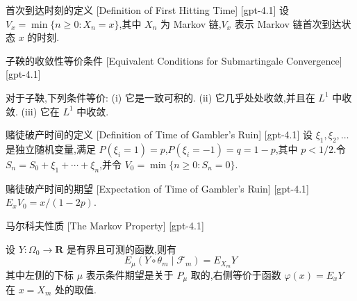 \documentclass[UTF8]{ctexart}
\begin{document}
    
    
    \begin{dfn}
        {首次到达时刻的定义}
        [Definition of First Hitting Time]
        [gpt-4.1]
        设 $V_{x} = \operatorname*{min} \{n \geq 0 : X_{n} = x\}$,其中 $X_n$ 为 Markov 链,$V_x$ 表示 Markov 链首次到达状态 $x$ 的时刻.
    \end{dfn}
    
    
    
    \begin{thm}
        {子鞅的收敛性等价条件}
        [Equivalent Conditions for Submartingale Convergence]
        [gpt-4.1]
        
对于子鞅,下列条件等价:
(i) 它是一致可积的.
(ii) 它几乎处处收敛,并且在 $L^1$ 中收敛.
(iii) 它在 $L^1$ 中收敛.

    \end{thm}
    
    
    
    \begin{dfn}
        {赌徒破产时间的定义}
        [Definition of Time of Gambler's Ruin]
        [gpt-4.1]
        设 $\xi_1, \xi_2, \ldots$ 是独立随机变量,满足 $P(\xi_i = 1) = p$,$P(\xi_i = -1) = q = 1 - p$,其中 $p < 1/2$.令 $S_n = S_0 + \xi_1 + \cdots + \xi_n$,并令 $V_0 = \min\{n \geq 0 : S_n = 0\}$.
    \end{dfn}
    
    
    
    \begin{thm}
        {赌徒破产时间的期望}
        [Expectation of Time of Gambler's Ruin]
        [gpt-4.1]
        $E_x V_0 = x / (1 - 2p)$.
    \end{thm}
    
    
    
    \begin{thm}
        {马尔科夫性质}
        [The Markov Property]
        [gpt-4.1]
        
设 $Y : \Omega_0 \to \mathbf{R}$ 是有界且可测的函数,则有
\[
E_{\mu}(Y \circ \theta_m \mid \mathcal{F}_m) = E_{X_m} Y
\]
其中左侧的下标 $\mu$ 表示条件期望是关于 $P_\mu$ 取的,右侧等价于函数 $\varphi(x) = E_x Y$ 在 $x = X_m$ 处的取值.

    \end{thm}
    
\end{document}
